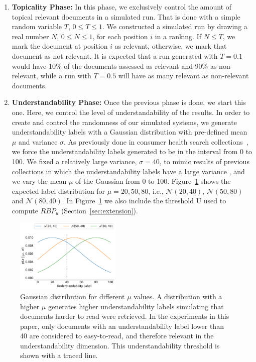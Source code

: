 \begin{enumerate}
\item \textbf{Topicality Phase:} In this phase, we exclusively control the amount of topical relevant documents in a simulated run. That is done with a simple random variable $T$, $0 \le T \le 1$. 
We constructed a simulated run by drawing a real number $N$, $0 \le N \le 1$, for each position $i$ in a ranking. If $N \le T$, we mark the document at position $i$ as relevant, otherwise, we mark that document as not relevant. It is expected that a run generated with $T=0.1$ would have 10\% of the documents assessed as relevant and 90\% as non-relevant, while a run with $T=0.5$ will have as many relevant as non-relevant documents. 

\item \textbf{Understandability Phase:}  Once the previous phase is done, we start this one. Here, we control the level of understandability of the results. In order to create and control the randomness of our simulated systems, we generate understandability labels with a Gaussian distribution with pre-defined mean $\mu$ and variance $\sigma$. 
As previously done in consumer health search collections~\cite{clef16}, we force the understandability labels generated to be in the interval from 0 to 100. 
We fixed a relatively large variance, $\sigma=40$, to mimic results of previous collections in which the understandability labels have a large variance \cite{clef16}, and we vary the mean $\mu$ of the Gaussian from 0 to 100. Figure~\ref{fig:gaussians} shows the expected label distribution for $\mu=20, 50, 80$, i.e., $\mathcal{N}(20, 40)$, $\mathcal{N}(50, 80)$ and $\mathcal{N}(80, 40)$.
In Figure~\ref{fig:gaussians} we also include the threshold U used to compute $RBP_u$ (Section~\ref{sec:extension}).

\end{enumerate}

\begin{figure}[t!]
  \centering
   \includegraphics[width=0.45\textwidth]{figs/gaussians}
    \caption{Gaussian distribution for different $\mu$ values. A distribution with a higher $\mu$ generates higher understandability labels simulating that documents harder to read were retrieved. In the experiments in this paper, only documents with an understandability label lower than 40 are considered to easy-to-read, and therefore relevant in the understandability dimension. This understandability threshold is shown with a traced line.}
  \label{fig:gaussians}
\end{figure}

